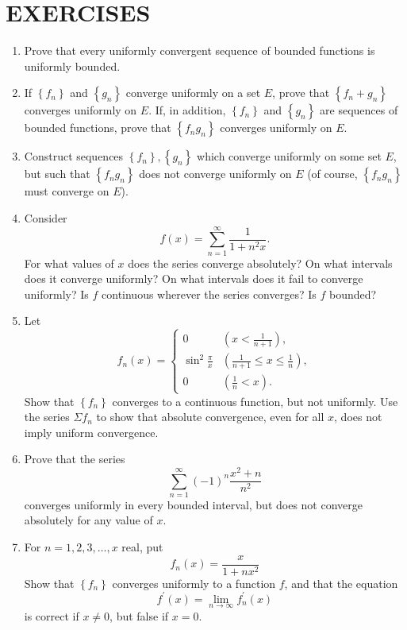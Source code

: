\documentclass[10pt]{article}
\begin{document}
\section*{EXERCISES}
\begin{enumerate}
  \item Prove that every uniformly convergent sequence of bounded functions is uniformly bounded.

  \item If $\left\{f_{n}\right\}$ and $\left\{g_{n}\right\}$ converge uniformly on a set $E$, prove that $\left\{f_{n}+g_{n}\right\}$ converges uniformly on $E$. If, in addition, $\left\{f_{n}\right\}$ and $\left\{g_{n}\right\}$ are sequences of bounded functions, prove that $\left\{f_{n} g_{n}\right\}$ converges uniformly on $E$.

  \item Construct sequences $\left\{f_{n}\right\},\left\{g_{n}\right\}$ which converge uniformly on some set $E$, but such that $\left\{f_{n} g_{n}\right\}$ does not converge uniformly on $E$ (of course, $\left\{f_{n} g_{n}\right\}$ must converge on $E$).

  \item Consider
  $$
  f(x)=\sum_{n=1}^{\infty} \frac{1}{1+n^{2} x} .
  $$
  For what values of $x$ does the series converge absolutely? On what intervals does it converge uniformly? On what intervals does it fail to converge uniformly? Is $f$ continuous wherever the series converges? Is $f$ bounded?

  \item Let
  $$
  f_{n}(x)= \begin{cases}0 & \left(x<\frac{1}{n+1}\right), \\ \sin ^{2} \frac{\pi}{x} & \left(\frac{1}{n+1} \leq x \leq \frac{1}{n}\right), \\ 0 & \left(\frac{1}{n}<x\right) .\end{cases}
  $$
  Show that $\left\{f_{n}\right\}$ converges to a continuous function, but not uniformly. Use the series $\Sigma f_{n}$ to show that absolute convergence, even for all $x$, does not imply uniform convergence.

  \item Prove that the series
  $$
  \sum_{n=1}^{\infty}(-1)^{n} \frac{x^{2}+n}{n^{2}}
  $$
  converges uniformly in every bounded interval, but does not converge absolutely for any value of $x$.

  \item For $n=1,2,3, \ldots, x$ real, put
  $$
  f_{n}(x)=\frac{x}{1+n x^{2}}
  $$
  Show that $\left\{f_{n}\right\}$ converges uniformly to a function $f$, and that the equation
  $$
  f^{\prime}(x)=\lim _{n \rightarrow \infty} f_{n}^{\prime}(x)
  $$
  is correct if $x \neq 0$, but false if $x=0$.


\end{enumerate}
\end{document}
